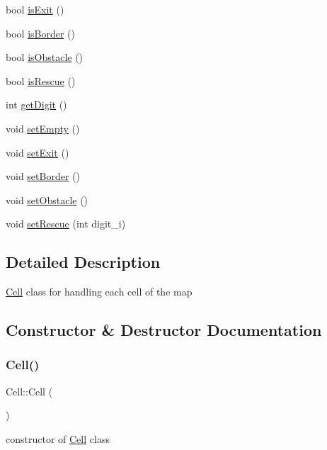 \begin{DoxyCompactItemize}
bool \mbox{\hyperlink{class_cell_aaf13f5d308c7f1eb670a050e4fc6dc28}{is\+Exit}} ()
\item 
bool \mbox{\hyperlink{class_cell_a34d62b7c65fd85f356bd9e2c3058edcb}{is\+Border}} ()
\item 
bool \mbox{\hyperlink{class_cell_aee32093f779b1fa761b43a6b0a86ed6c}{is\+Obstacle}} ()
\item 
bool \mbox{\hyperlink{class_cell_ad86a719c04ff04bdf79c1c0b8e5a5942}{is\+Rescue}} ()
\item 
int \mbox{\hyperlink{class_cell_a335c410074aaac9bb5594ea8adf648ff}{get\+Digit}} ()
\item 
void \mbox{\hyperlink{class_cell_a6047939b792e819bc2330151ff98864f}{set\+Empty}} ()
\item 
void \mbox{\hyperlink{class_cell_a9fa0a3c17d798320c78bffe44411008e}{set\+Exit}} ()
\item 
void \mbox{\hyperlink{class_cell_aa690e62809d36d512cd39ccda9cea293}{set\+Border}} ()
\item 
void \mbox{\hyperlink{class_cell_a34e953e7f720c3382f0b13c2480cafd0}{set\+Obstacle}} ()
\item 
void \mbox{\hyperlink{class_cell_afa194cda3c1e8f9be100c9a14fda7f9d}{set\+Rescue}} (int digit\+\_\+i)
\end{DoxyCompactItemize}


\subsection{Detailed Description}
\mbox{\hyperlink{class_cell}{Cell}} class for handling each cell of the map 

\subsection{Constructor \& Destructor Documentation}
\mbox{\label{class_cell_a394510643e8664cf12b5efaf5cb99f71}} 
\subsubsection{\texorpdfstring{Cell()}{Cell()}}
{\footnotesize\ttfamily Cell\+::\+Cell (\begin{DoxyParamCaption}{ }\end{DoxyParamCaption})}

constructor of \mbox{\hyperlink{class_cell}{Cell}} class \mbox{\label{class_cell_a9fa559f7a28e2b4336c6879ca09304d8}} 
